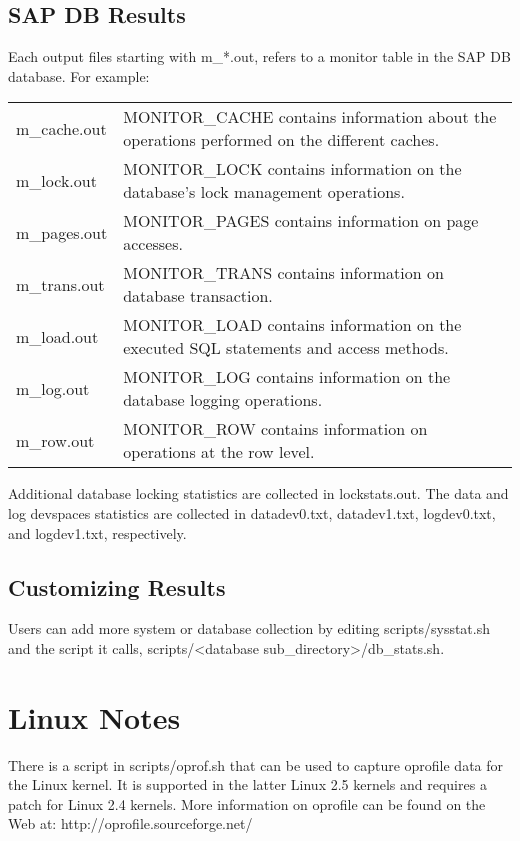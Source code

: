 \documentclass{article}
\begin{document}
\subsection{SAP DB Results}

Each output files starting with m\_*.out, refers to a monitor table in the
SAP DB database.  For example: \\
\begin{tabular}[c]{ll}
m\_cache.out & MONITOR\_CACHE contains information about the operations
               performed on the different caches. \\
m\_lock.out & MONITOR\_LOCK contains information on the database's lock
              management operations. \\
m\_pages.out & MONITOR\_PAGES contains information on page accesses. \\
m\_trans.out & MONITOR\_TRANS contains information on database transaction. \\
m\_load.out & MONITOR\_LOAD contains information on the executed SQL
              statements and access methods. \\
m\_log.out  & MONITOR\_LOG contains information on the database logging
              operations. \\
m\_row.out & MONITOR\_ROW contains information on operations at the row
             level. \\
\end{tabular}

Additional database locking statistics are collected in lockstats.out.  The
data and log devspaces statistics are collected in datadev0.txt, datadev1.txt,
logdev0.txt, and logdev1.txt, respectively.

\subsection{Customizing Results}

Users can add more system or database collection by editing scripts/sysstat.sh
and the script it calls,  scripts/<database sub\_directory>/db\_stats.sh.

\section{Linux Notes}

There is a script in scripts/oprof.sh that can be used to capture oprofile
data for the Linux kernel.  It is supported in the latter Linux 2.5 kernels
and requires a patch for Linux 2.4 kernels.  More information on oprofile can
be found on the Web at:
	http://oprofile.sourceforge.net/
\end{document}
